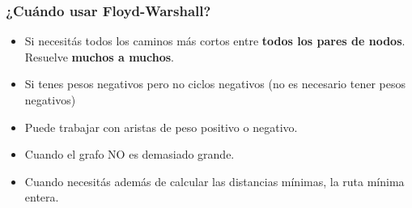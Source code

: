 \documentclass[10pt,a4paper]{article}
\begin{document}
\subsubsection*{¿Cuándo usar Floyd-Warshall?}
\begin{itemize}
    \item Si necesitás todos los caminos más cortos entre \textbf{todos los pares de nodos}. Resuelve \textbf{muchos a muchos}.
    \item Si tenes pesos negativos pero no ciclos negativos (no es necesario tener pesos negativos)
    \item Puede trabajar con aristas de peso positivo o negativo.
    \item Cuando el grafo NO es demasiado grande.
    \item Cuando necesitás además de calcular las distancias mínimas, la ruta mínima entera.
\end{itemize}
\end{document}
